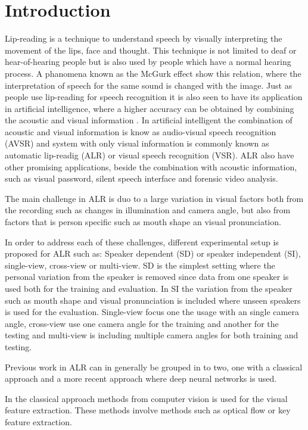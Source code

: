 \section{Introduction}
Lip-reading is a technique to understand speech by visually interpreting the movement of the lips, face and thought.
This technique is not limited to deaf or hear-of-hearing people but is also used by people which have a normal hearing process.
A phanomena known as the McGurk effect\cite{mcGurk} show this relation, where the interpretation of speech for the same sound is changed with the image.
Just as people use lip-reading for speech recognition it is also seen to have its application in artificial intelligence, where a higher accuracy can be obtained by combining the acoustic and visual information \cite{Ngiam2011}.
In artificial intelligent the combination of acoustic and visual information is know as audio-visual speech recognition (AVSR) and system with only visual information is commonly known as automatic lip-readig (ALR) or visual speech recognition (VSR).
ALR also have other promising applications, beside the combination with acoustic information, such as visual password, silent speech interface and forensic video analysis.

The main challenge in ALR is duo to a large variation in visual factors both from the recording such as changes in illumination and camera angle\cite{Potamianos2003}, but also from factors that is person specific such as mouth shape an visual pronunciation. 

In order to address each of these challenges, different experimental setup is proposed for ALR such as:
Speaker dependent (SD) or speaker independent (SI), single-view, cross-view or multi-view.
SD is the simplest setting where the personal variation from the speaker is removed since data from one speaker is used both for the training and evaluation.
In SI the variation from the speaker such as mouth shape and visual pronunciation is included where unseen speakers is used for the evaluation.
Single-view focus one the usage with an single camera angle, cross-view use one camera angle for the training and another for the testing and multi-view is including multiple camera angles for both training and testing.

Previous work in ALR can in generally be grouped in to two, one with a classical approach and a more recent approach where deep neural networks is used.

In the classical approach methods from computer vision is used for the visual feature extraction.
These methods involve methods such as optical flow\cite{Shaikh2010} or key feature extraction\cite{Li2008}.

